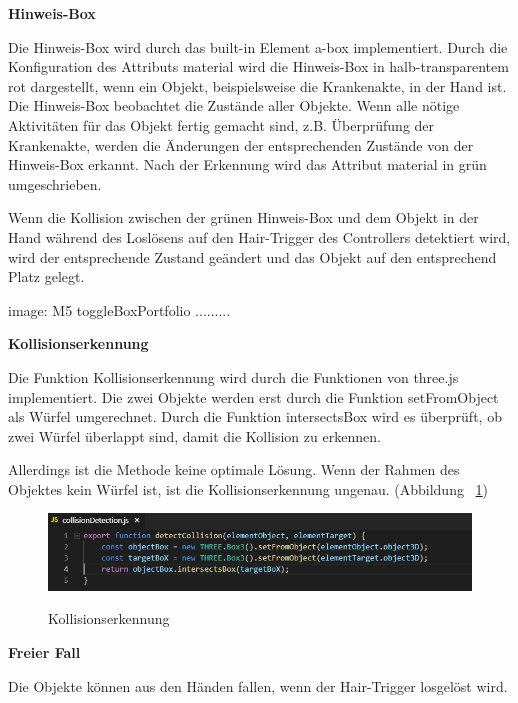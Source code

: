   \textbf{Hinweis-Box}
  
  Die Hinweis-Box wird durch das built-in Element {\selectfont a-box} implementiert. Durch die Konfiguration des Attributs {\selectfont material} wird die Hinweis-Box in halb-transparentem rot dargestellt, wenn ein Objekt, beispielsweise die Krankenakte, in der Hand ist. Die Hinweis-Box beobachtet die Zustände aller Objekte. Wenn alle nötige Aktivitäten für das Objekt fertig gemacht sind, z.B. Überprüfung der Krankenakte, werden die Änderungen der entsprechenden Zustände von der Hinweis-Box erkannt. Nach der Erkennung wird das Attribut {\selectfont material} in grün umgeschrieben.
  
  Wenn die Kollision zwischen der grünen Hinweis-Box und dem Objekt in der Hand während des Loslösens auf den Hair-Trigger des Controllers detektiert wird, wird der entsprechende Zustand geändert und das Objekt auf den entsprechend Platz gelegt.
  
  image: M5 toggleBoxPortfolio .........
  
  \textbf{Kollisionserkennung}
  
  Die Funktion Kollisionserkennung wird durch die Funktionen von three.js implementiert. Die zwei Objekte werden erst durch die Funktion {\selectfont setFromObject} als Würfel umgerechnet. Durch die Funktion {\selectfont intersectsBox} wird es überprüft, ob zwei Würfel überlappt sind, damit die Kollision zu erkennen.
  
  Allerdings ist die Methode keine optimale Lösung. Wenn der Rahmen des Objektes kein Würfel ist, ist die Kollisionserkennung ungenau. (Abbildung ~\ref{fig:collisionDetection})
  
\begin{figure}[ht]
\vspace*{1em}
\centering
\caption[Kollisionserkennung]{Kollisionserkennung}
\includegraphics[width=\textwidth]{images/collisionDetection.png}
\label{fig:collisionDetection} 
\end{figure}
  
  \textbf{Freier Fall}
  
  Die Objekte können aus den Händen fallen, wenn der Hair-Trigger losgelöst wird.
  
